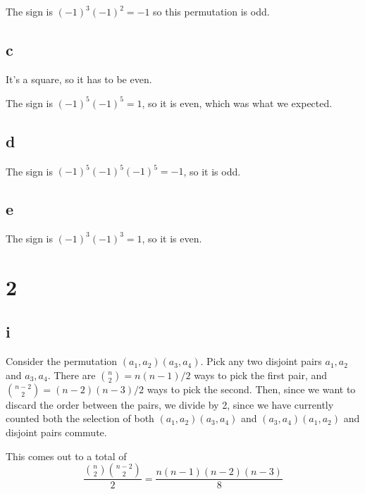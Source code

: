 \documentclass[12pt,letterpaper]{article}
\theoremstyle{definition}
\begin{document}
The sign is $(-1)^{3}(-1)^{2} = -1$ so this permutation is odd.

\subsection*{c}

It's a square, so it has to be even.

The sign is $(-1)^{5}(-1)^{5} = 1$, so it is even, which was what we expected.

\subsection*{d}

The sign is $(-1)^{5}(-1)^{5}(-1)^{5} = -1$, so it is odd.

\subsection*{e}

The sign is $(-1)^{3}(-1)^{3} = 1$, so it is even.


\section*{2}

\subsection*{i}


Consider the permutation $(a_{1},a_{2})(a_{3},a_{4})$. Pick any two disjoint pairs $a_{1},a_{2}$ and $a_{3}, a_{4}$. There are $\binom{n}{2} = n(n-1)/2$ ways to pick the first pair, and $\binom{n-2}{2} = (n-2)(n-3)/2$ ways to pick the second. Then, since we want to discard the order between the pairs, we divide by 2, since we have currently counted both the selection of both $(a_{1},a_{2})(a_{3},a_{4})$ and $(a_{3},a_{4})(a_{1},a_{2})$ and disjoint pairs commute.


This comes out to a total of
\[
  \frac{\binom{n}{2}\binom{n-2}{2}}{2} = \frac{n(n-1)(n-2)(n-3)}{8}
\]
\end{document}
